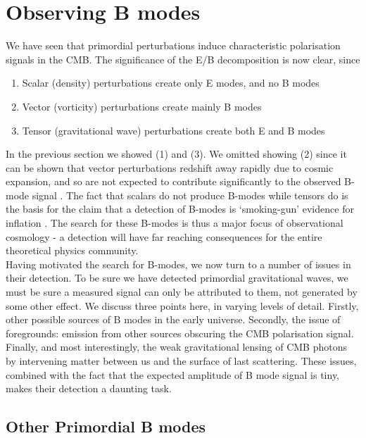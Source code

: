\documentclass[a4paper,10pt]{article}
\begin{document}
\newpage
\section{Observing B modes}


We have seen that primordial perturbations induce characteristic polarisation signals in the CMB. The significance of the E/B decomposition is now clear, since

\begin{enumerate}
\item Scalar (density) perturbations create only E modes, and no B modes
\item Vector (vorticity) perturbations create mainly B modes
\item Tensor (gravitational wave) perturbations create both E and B modes
\end{enumerate}

In the previous section we showed (1) and (3). We omitted showing (2) since it can be shown that vector perturbations redshift away rapidly due to cosmic expansion, and so are not expected to contribute significantly to the observed B-mode signal  \cite{vector}. The fact that scalars do not produce B-modes while tensors do is the basis for the claim that a detection of B-modes is `smoking-gun'  evidence for inflation \cite{smokinggun}. The search for these B-modes is thus a major focus of observational cosmology - a detection will have far reaching consequences for the entire theoretical physics community. \\

Having motivated the search for B-modes, we now turn to a number of issues in their detection. To be sure we have detected primordial gravitational waves, we must be sure a measured signal can only be attributed to them, not generated by some other effect. We discuss three points here, in varying levels of detail. Firstly, other possible sources of B modes in the early universe. Secondly, the issue of foregrounds: emission from other sources obscuring the CMB polarisation signal. Finally, and most interestingly, the weak gravitational lensing of CMB photons by intervening matter between us and the surface of last scattering. These issues, combined with the fact that the expected amplitude of B mode signal is tiny, makes their detection a daunting task.


\subsection{Other Primordial B modes}
\label{vectorissues}
\end{document}
